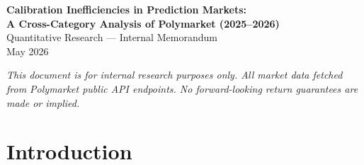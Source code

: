 \documentclass[11pt,a4paper]{article}
\begin{document}
\begin{titlepage}
\centering
\vspace*{2cm}
{\LARGE\bfseries Calibration Inefficiencies in Prediction Markets:\\[6pt]
A Cross-Category Analysis of Polymarket (2025--2026)}\\[2cm]

{\large Quantitative Research --- Internal Memorandum}\\[0.5cm]
{\large May 2026}\\[3cm]

\begin{abstract}
\noindent
We analyse 17,458 resolved binary markets across 14 categories on Polymarket
(July 2025--May 2026) to identify calibration inefficiencies exploitable after
realistic transaction costs.
Every category exhibits a consistent pattern: markets priced 10--30\% YES
overestimate the probability of the low-probability outcome, with actual YES
rates of 0--20\% versus predicted rates of 10--30\%.
The largest single-bin gross edge is \textbf{+18.6 percentage points} in
Finance markets at the 20--30\% price level.
The most robust edge is in Baseball (20--40\% bins, $\delta \approx +14\,\mathrm{pp}$)
and Tennis (20--30\% bin, $\delta = +16.1\,\mathrm{pp}$).
Politics markets show a distinct pattern: near-50/50 markets ($40$--$50\%$)
resolve YES roughly 58\% of the time, implying an edge for \emph{buying YES}
in close political races.
No category achieves Hosmer--Lemeshow $p < 0.05$ at the aggregate level,
indicating that miscalibration is concentrated in the tails rather than the
full distribution.
We recommend the 20--30\% YES bin in Baseball and Finance as the highest
confidence entry points for a NO-buying strategy.
\end{abstract}

\vfill
{\small\itshape This document is for internal research purposes only.
All market data fetched from Polymarket public API endpoints.
No forward-looking return guarantees are made or implied.}
\end{titlepage}

\tableofcontents
\newpage

\section{Introduction}
\end{document}
